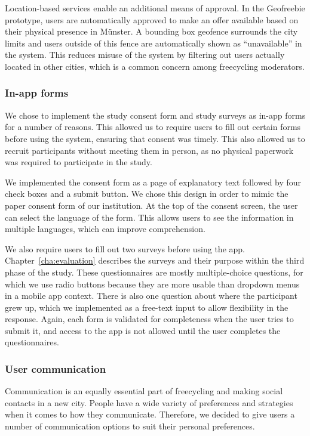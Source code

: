 Location-based services enable an additional means of approval. In the Geofreebie prototype, users are automatically approved to make an offer available based on their physical presence in Münster. A bounding box geofence surrounds the city limits and users outside of this fence are automatically shown as ``unavailable'' in the system. This reduces misuse of the system by filtering out users actually located in other cities, which is a common concern among freecycling moderators.

\subsubsection*{In-app forms}

We chose to implement the study consent form and study surveys as in-app forms for a number of reasons. This allowed us to require users to fill out certain forms before using the system, ensuring that consent was timely. This also allowed us to recruit participants without meeting them in person, as no physical paperwork was required to participate in the study.

We implemented the consent form as a page of explanatory text followed by four check boxes and a submit button. We chose this design in order to mimic the paper consent form of our institution. At the top of the consent screen, the user can select the language of the form. This allows users to see the information in multiple languages, which can improve comprehension.

We also require users to fill out two surveys before using the app. Chapter~\ref{cha:evaluation} describes the surveys and their purpose within the third phase of the study. These questionnaires are mostly multiple-choice questions, for which we use radio buttons because they are more usable than dropdown menus in a mobile app context. There is also one question about where the participant grew up, which we implemented as a free-text input to allow flexibility in the response. Again, each form is validated for completeness when the user tries to submit it, and access to the app is not allowed until the user completes the questionnaires.

\subsubsection*{User communication}

Communication is an equally essential part of freecycling and making social contacts in a new city. People have a wide variety of preferences and strategies when it comes to how they communicate. Therefore, we decided to give users a number of communication options to suit their personal preferences.

